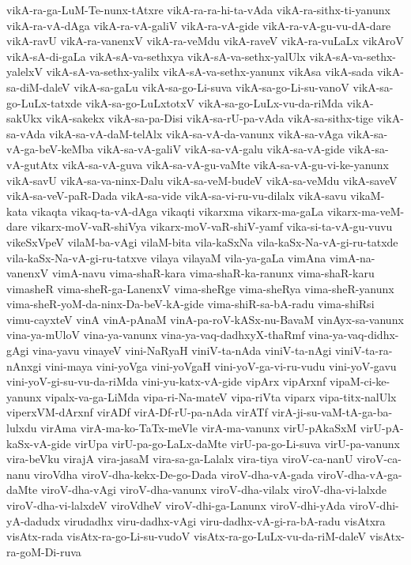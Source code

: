 {vikA-ra-ga-LuM-Te-nunx-tAtxre
vikA-ra-ra-hi-ta-vAda
vikA-ra-sithx-ti-yanunx
vikA-ra-vA-dAga
vikA-ra-vA-galiV
vikA-ra-vA-gide
vikA-ra-vA-gu-vu-dA-dare
vikA-ravU
vikA-ra-vanenxV
vikA-ra-veMdu
vikA-raveV
vikA-ra-vuLaLx
vikAroV
vikA-sA-di-gaLa
vikA-sA-va-sethxya
vikA-sA-va-sethx-yalUlx
vikA-sA-va-sethx-yalelxV
vikA-sA-va-sethx-yalilx
vikA-sA-va-sethx-yanunx
vikAsa
vikA-sada
vikA-sa-diM-daleV
vikA-sa-gaLu
vikA-sa-go-Li-suva
vikA-sa-go-Li-su-vanoV
vikA-sa-go-LuLx-tatxde
vikA-sa-go-LuLxtotxV
vikA-sa-go-LuLx-vu-da-riMda
vikA-sakUkx
vikA-sakekx
vikA-sa-pa-Disi
vikA-sa-rU-pa-vAda
vikA-sa-sithx-tige
vikA-sa-vAda
vikA-sa-vA-daM-telAlx
vikA-sa-vA-da-vanunx
vikA-sa-vAga
vikA-sa-vA-ga-beV-keMba
vikA-sa-vA-galiV
vikA-sa-vA-galu
vikA-sa-vA-gide
vikA-sa-vA-gutAtx
vikA-sa-vA-guva
vikA-sa-vA-gu-vaMte
vikA-sa-vA-gu-vi-ke-yanunx
vikA-savU
vikA-sa-va-ninx-Dalu
vikA-sa-veM-budeV
vikA-sa-veMdu
vikA-saveV
vikA-sa-veV-paR-Dada
vikA-sa-vide
vikA-sa-vi-ru-vu-dilalx
vikA-savu
vikaM-kata
vikaqta
vikaq-ta-vA-dAga
vikaqti
vikarxma
vikarx-ma-gaLa
vikarx-ma-veM-dare
vikarx-moV-vaR-shiVya
vikarx-moV-vaR-shiV-yamf
vika-si-ta-vA-gu-vuvu
vikeSxVpeV
vilaM-ba-vAgi
vilaM-bita
vila-kaSxNa
vila-kaSx-Na-vA-gi-ru-tatxde
vila-kaSx-Na-vA-gi-ru-tatxve
vilaya
vilayaM
vila-ya-gaLa
vimAna
vimA-na-vanenxV
vimA-navu
vima-shaR-kara
vima-shaR-ka-ranunx
vima-shaR-karu
vimasheR
vima-sheR-ga-LanenxV
vima-sheRge
vima-sheRya
vima-sheR-yanunx
vima-sheR-yoM-da-ninx-Da-beV-kA-gide
vima-shiR-sa-bA-radu
vima-shiRsi
vimu-cayxteV
vinA
vinA-pAnaM
vinA-pa-roV-kASx-nu-BavaM
vinAyx-sa-vanunx
vina-ya-mUloV
vina-ya-vanunx
vina-ya-vaq-dadhxyX-thaRmf
vina-ya-vaq-didhx-gAgi
vina-yavu
vinayeV
vini-NaRyaH
viniV-ta-nAda
viniV-ta-nAgi
viniV-ta-ra-nAnxgi
vini-maya
vini-yoVga
vini-yoVgaH
vini-yoV-ga-vi-ru-vudu
vini-yoV-gavu
vini-yoV-gi-su-vu-da-riMda
vini-yu-katx-vA-gide
vipArx
vipArxnf
vipaM-ci-ke-yanunx
vipalx-va-ga-LiMda
vipa-ri-Na-mateV
vipa-riVta
viparx
vipa-titx-nalUlx
viperxVM-dArxnf
virADf
virA-Df-rU-pa-nAda
virATf
virA-ji-su-vaM-tA-ga-ba-lulxdu
virAma
virA-ma-ko-TaTx-meVle
virA-ma-vanunx
virU-pAkaSxM
virU-pA-kaSx-vA-gide
virUpa
virU-pa-go-LaLx-daMte
virU-pa-go-Li-suva
virU-pa-vanunx
vira-beVku
virajA
vira-jasaM
vira-sa-ga-Lalalx
vira-tiya
viroV-ca-nanU
viroV-ca-nanu
viroVdha
viroV-dha-kekx-De-go-Dada
viroV-dha-vA-gada
viroV-dha-vA-ga-daMte
viroV-dha-vAgi
viroV-dha-vanunx
viroV-dha-vilalx
viroV-dha-vi-lalxde
viroV-dha-vi-lalxdeV
viroVdheV
viroV-dhi-ga-Lanunx
viroV-dhi-yAda
viroV-dhi-yA-dadudx
virudadhx
viru-dadhx-vAgi
viru-dadhx-vA-gi-ra-bA-radu
visAtxra
visAtx-rada
visAtx-ra-go-Li-su-vudoV
visAtx-ra-go-LuLx-vu-da-riM-daleV
visAtx-ra-goM-Di-ruva
}
